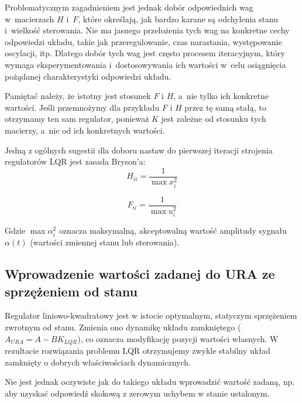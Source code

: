 \documentclass{article}
\begin{document}
    Problematycznym zagadnieniem jest jednak dobór odpowiednich wag
    w~macierzach $H$ i~$F$, które określają, jak bardzo karane są odchylenia
    stanu i~wielkość sterowania.
    Nie ma jasnego przełożenia tych wag na konkretne cechy odpowiedzi układu,
    takie jak przeregulowanie, czas narastania, występowanie oscylacji, itp.
    Dlatego dobór tych wag jest często procesem iteracyjnym, który wymaga
    eksperymentowania i~dostosowywania ich wartości w~celu osiągnięcia pożądanej
    charakterystyki odpowiedzi układu.
    
    \begin{tcolorbox}[colback=orange!5, colframe=orange!75!black, title=Uwaga]
        Pamiętać należy, że istotny jest stosunek $F$ i $H$, a~nie tylko ich
        konkretne wartości.
        Jeśli przemnożymy dla przykładu $F$ i $H$ przez tę samą stałą,
        to otrzymamy ten sam regulator, ponieważ $K$ jest zależne od
        stosunku tych macierzy, a~nie od ich konkretnych wartości.
    \end{tcolorbox} 
    
    
    Jedną z ogólnych sugestii dla doboru nastaw do pierwszej iteracji strojenia regulatorów LQR jest zasada Bryson’a:
    \begin{equation*}
        H_{ii} = \frac{1}{\max x_{i}^2}
    \end{equation*}

    \begin{equation*}
        F_{ii} = \frac{1}{\max u_{i}^2}
    \end{equation*}

    Gdzie $\max \alpha_{i}^2$ oznacza maksymalną, akceptowalną wartość amplitudy sygnału $\alpha(t)$ (wartości zmiennej stanu lub sterowania).

    \subsection{Wprowadzenie wartości zadanej do URA ze sprzężeniem od stanu}
    Regulator liniowo-kwadratowy jest w istocie optymalnym, statyczym sprzężeniem zwrotnym od stanu.
    Zmienia ono dynamikę układu zamkniętego ($A_{URA} = A - BK_{LQR}$), co oznacza modyfikację pozycji wartości własnych.
    W rezultacie rozwiązania problemu LQR otrzymujemy zwykle stabilny układ zamknięty o dobrych właściwościach dynamicznych.
    
    Nie jest jednak oczywiste jak do takiego układu wprowadzić wartość zadaną, np. aby uzyskać odpowiedź skokową z zerowym uchybem w stanie ustalonym.
    
\end{document}
